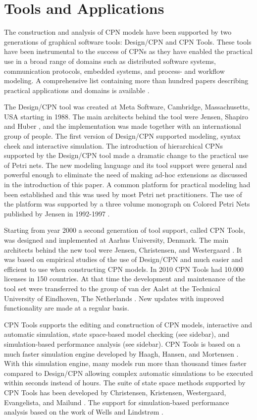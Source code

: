 \section{Tools and Applications}

The construction and analysis of CPN models have been supported by two
generations of graphical software tools: Design/CPN and CPN
Tools. These tools have been instrumental to the success of CPNs as
they have enabled the practical use in a broad range of domains such
as distributed software systems, communication protocols, embedded
systems, and process- and workflow modeling. A comprehensive list
containing more than hundred papers describing practical applications
and domains is available \cite{cpnuse}.

The Design/CPN tool \cite{tacas97} was created at Meta Software,
Cambridge, Massachusetts, USA starting in 1988. The main architects
behind the tool were Jensen, Shapiro and Huber
\cite{jensen:cpnmanual}, and the implementation was made together with
an international group of people. The first version of Design/CPN
supported modeling, syntax cheek and interactive simulation. The
introduction of hierarchical CPNs supported by the Design/CPN tool
made a dramatic change to the practical use of Petri nets. The new
modeling language and its tool support were general and powerful
enough to eliminate the need of making ad-hoc extensions as discussed
in the introduction of this paper. A common platform for practical
modeling had been established and this was used by most Petri net
practitioners. The use of the platform was supported by a three volume
monograph on Colored Petri Nets published by Jensen in 1992-1997
\cite{jensen:cpnvols}.  

Starting from year 2000 a second generation of tool support, called
CPN Tools, was designed and implemented at Aarhus University,
Denmark. The main architects behind the new tool were Jensen,
Christensen, and Westergaard \cite{cpn2003}.  It was based on
empirical studies of the use of Design/CPN and much easier and
efficient to use when constructing CPN models. In 2010 CPN Tools had
10.000 licenses in 150 countries. At that time the development and
maintenance of the tool set were transferred to the group of van der
Aalst at the Technical University of Eindhoven, The Netherlands
\cite{cpntoolsweb}. New updates with improved functionality are made
at a regular basis.

CPN Tools supports the editing and construction of CPN models,
interactive and automatic simulation, state space-based model checking
(see sidebar), and simulation-based performance analysis (see
sidebar). CPN Tools is based on a much faster simulation engine
developed by Haagh, Hansen, and Mortensen \cite{newsim}. With this
simulation engine, many models run more than thousand times faster
compared to Design/CPN allowing complex automatic simulations to be
executed within seconds instead of hours. The suite of state space
methods supported by CPN Tools has been developed by Christensen,
Kristensen, Westergaard, Evangelista, and Mailund
\cite{asap,sweep}. The support for simulation-based performance
analysis based on the work of Wells and Lindstr\o{}m
\cite{performance1}.

